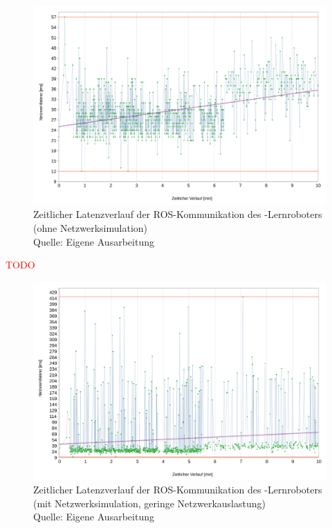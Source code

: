 \begin{figure}[htb]
	\centering
	\includegraphics[width=1.04\textwidth]{images/ergebnisse/Messung_der_ROS_Kommunikation_App_und_keine_Netzwerksimulation}
	\caption[Zeitlicher Latenzverlauf der ROS-Kommunikation des -Lernroboters (ohne Netzwerksimulation)]{Zeitlicher Latenzverlauf der ROS-Kommunikation des -Lernroboters (ohne Netzwerksimulation)\\Quelle: Eigene Ausarbeitung}
	\label{fig:measurement_robot_ros_without_network_simulation}
\end{figure}
\FloatBarrier

\textcolor{red}{TODO}

\begin{figure}[htb]
	\centering
	\includegraphics[width=1.04\textwidth]{images/ergebnisse/ROS_App_und_mit_Netzwerksimulation}
	\caption[Zeitlicher Latenzverlauf der ROS-Kommunikation des -Lernroboters (mit Netzwerksimulation, geringe Netzwerkauslastung)]{Zeitlicher Latenzverlauf der ROS-Kommunikation des -Lernroboters (mit Netzwerksimulation, geringe Netzwerkauslastung)\\Quelle: Eigene Ausarbeitung}
	\label{fig:measurement_robot_ros_with_network_simulation_low_network_traffic}
\end{figure}
\FloatBarrier

